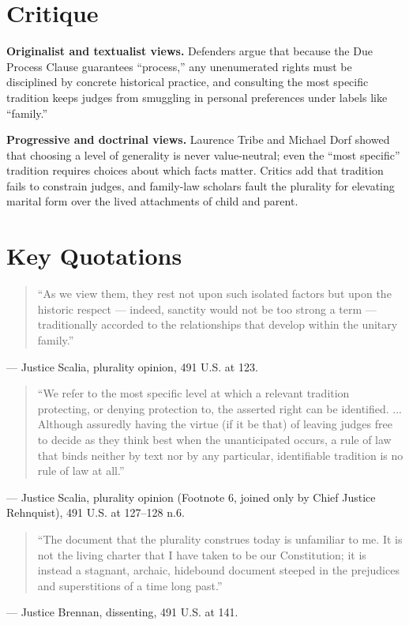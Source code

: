 \documentclass[12pt]{article}
\begin{document}
\section{Critique}

\textbf{Originalist and textualist views.} Defenders argue that because the Due Process Clause guarantees ``process,'' any unenumerated rights must be disciplined by concrete historical practice, and consulting the most specific tradition keeps judges from smuggling in personal preferences under labels like ``family.''

\textbf{Progressive and doctrinal views.} Laurence Tribe and Michael Dorf showed that choosing a level of generality is never value-neutral; even the ``most specific'' tradition requires choices about which facts matter. Critics add that tradition fails to constrain judges, and family-law scholars fault the plurality for elevating marital form over the lived attachments of child and parent.

\section{Key Quotations}

\begin{quote}
``As we view them, they rest not upon such isolated factors but upon the historic respect --- indeed, sanctity would not be too strong a term --- traditionally accorded to the relationships that develop within the unitary family.''
\end{quote}
\noindent --- Justice Scalia, plurality opinion, 491 U.S. at 123.

\begin{quote}
``We refer to the most specific level at which a relevant tradition protecting, or denying protection to, the asserted right can be identified. ... Although assuredly having the virtue (if it be that) of leaving judges free to decide as they think best when the unanticipated occurs, a rule of law that binds neither by text nor by any particular, identifiable tradition is no rule of law at all.''
\end{quote}
\noindent --- Justice Scalia, plurality opinion (Footnote 6, joined only by Chief Justice Rehnquist), 491 U.S. at 127--128 n.6.

\begin{quote}
``The document that the plurality construes today is unfamiliar to me. It is not the living charter that I have taken to be our Constitution; it is instead a stagnant, archaic, hidebound document steeped in the prejudices and superstitions of a time long past.''
\end{quote}
\noindent --- Justice Brennan, dissenting, 491 U.S. at 141.
\end{document}
